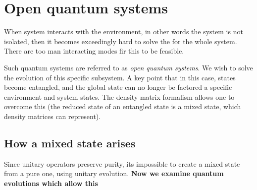\section{Open quantum systems\label{sec:textbook_open_quantum_systems}}
When system interacts with the environment, in other words the system is not isolated, then it becomes exceedingly hard to solve the \schrodinger for the whole system. There are too man interacting modes fir this to be feasible.

Such quantum systems are referred to as \textit{open quantum systems}. We wish to solve the evolution of this specific subsystem. A key point that in this case, states become entangled, and the global state can no longer be factored a specific environment and system states. The density matrix formalism allows one to overcome this (the reduced state of an entangled state is a mixed state, which density matrices can represent).

\subsection{How a mixed state arises}
Since unitary operators preserve purity, its impossible to create a mixed state from a pure one, using unitary evolution. \textbf{Now we examine quantum evolutions which allow this}

